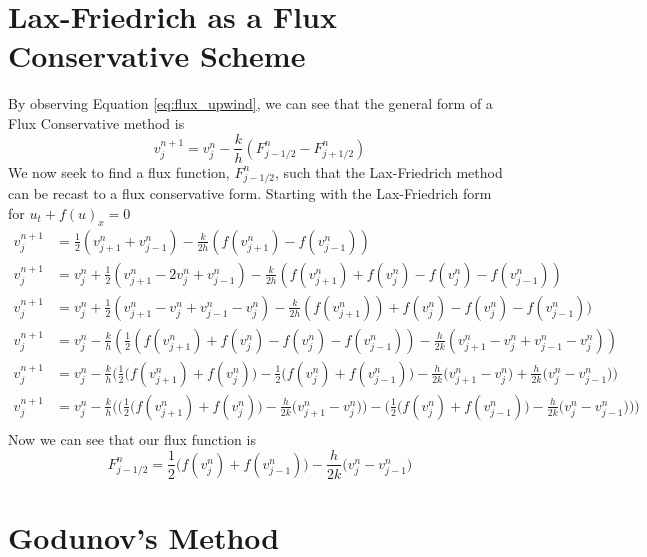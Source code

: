 \section{Lax-Friedrich as a Flux Conservative Scheme}
By observing Equation \ref{eq:flux_upwind}, we can see that the general form of a Flux Conservative method is
\begin{equation}\label{eq:gen_flux}
  v^{n+1}_j = v^n_j - \frac{k}{h}(F^n_{j-1/2} - F^n_{j+1/2})
\end{equation}
We now seek to find a flux function, $F^n_{j-1/2}$, such that the Lax-Friedrich method can be recast to a flux conservative form. Starting with the Lax-Friedrich form for $u_t + f(u)_x = 0$
\begin{equation*}
\begin{aligned}
  v^{n+1}_j &= \frac{1}{2}(v^n_{j+1} + v^n_{j-1}) - \frac{k}{2h}(f(v^n_{j+1})-f(v^n_{j-1})) \\
  v^{n+1}_j &= v^n_j + \frac{1}{2}(v^n_{j+1} - 2v^n_j + v^n_{j-1}) - \frac{k}{2h}(f(v^n_{j+1}) +f(v^n_j) -f(v^n_j) -f(v^n_{j-1})) \\
  v^{n+1}_j &= v^n_j + \frac{1}{2}(v^n_{j+1} - v^n_j + v^n_{j-1} - v^n_j) - \frac{k}{2h}(f(v^n_{j+1})) +f(v^n_j) -f(v^n_j) -f(v^n_{j-1})) \\
  v^{n+1}_j &= v^n_j - \frac{k}{h}(\frac{1}{2}(f(v^n_{j+1}) +f(v^n_j) -f(v^n_j) -f(v^n_{j-1})) - \frac{h}{2k}(v^n_{j+1} - v^n_j + v^n_{j-1} - v^n_j)) \\
  v^{n+1}_j &= v^n_j - \frac{k}{h}\Bigg(\frac{1}{2}\big(f(v^n_{j+1}) +f(v^n_j)\big) - \frac{1}{2}\big(f(v^n_j) +f(v^n_{j-1})\big) - \frac{h}{2k}\big(v^n_{j+1} - v^n_j\big) +  \frac{h}{2k}\big(v^n_j - v^n_{j-1}\big)\Bigg) \\
  v^{n+1}_j &= v^n_j - \frac{k}{h}\Bigg(\bigg(\frac{1}{2}\big(f(v^n_{j+1}) +f(v^n_j)\big)- \frac{h}{2k}\big(v^n_{j+1} - v^n_j\big)\bigg) - \bigg(\frac{1}{2}\big(f(v^n_j) +f(v^n_{j-1})\big)  -  \frac{h}{2k}\big(v^n_j - v^n_{j-1}\big) \bigg) \Bigg) \\
\end{aligned}
\end{equation*}
Now we can see that our flux function is
\begin{equation}
  F^n_{j-1/2} = \frac{1}{2}\big(f(v^n_j) +f(v^n_{j-1})\big)  -  \frac{h}{2k}\big(v^n_j - v^n_{j-1}\big)
\end{equation}
\section{Godunov's Method} 